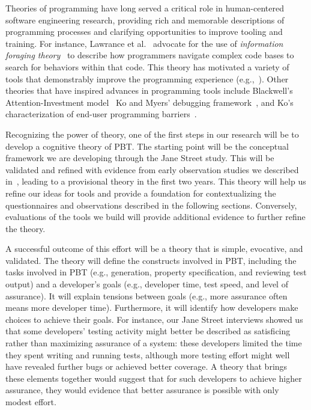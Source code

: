 %
Theories of
programming have
long served a critical role in human-centered software engineering
research, providing rich and memorable descriptions of programming
processes and clarifying opportunities to improve tooling and training.
For instance, Lawrance et al.~\cite{ref:lawrance2010programmers} advocate for the use of {\em information foraging
  theory}~\cite{ref:pirolli2003exploring} to
describe how programmers navigate complex code bases to search for behaviors
within that code. This
theory has motivated a variety of tools that demonstrably improve the
programming experience (e.g.,~\cite{ref:henley2014patchworks}).  Other theories
that have inspired advances in programming tools include
Blackwell's Attention-Investment model~\cite{ref:blackwell2002first} Ko and
Myers' debugging framework~\cite{ref:ko2005framework}, and Ko's characterization
of end-user programming barriers~\cite{ref:ko2004six}.

Recognizing the power of theory, one of the first steps in our
research will be to develop a cognitive theory of PBT. The starting point
will be the conceptual framework we are developing through the Jane Street study. This
will be validated and refined with evidence from early observation studies we
described in~, leading to a
provisional theory in the first two years.
This theory will help us
refine our ideas for
tools and provide a foundation for contextualizing the questionnaires and
observations described in the following sections. Conversely, evaluations of
the tools we build will provide additional evidence to further
refine the theory.

A successful outcome of this effort will be a
theory that is simple, evocative, and validated. The theory will
define the constructs involved in PBT,
including the tasks involved in PBT (e.g., generation, property specification,
and reviewing test output) and a developer's goals (e.g., developer time, test
speed, and level of assurance). It will explain tensions between goals (e.g.,
more assurance often means more developer time). Furthermore, it will identify
how developers make choices to achieve their goals. For instance, our Jane
Street interviews showed us that some developers' testing activity
might better be described as
satisficing~\cite{ref:brown2004consideration} rather than maximizing
assurance of a system: these developers limited the time they spent
writing and running tests, although more testing effort might well have
revealed further bugs or achieved better coverage. A theory that brings
these elements together would suggest that for such developers to
achieve higher assurance, they would evidence that better assurance is
possible with only modest effort.

